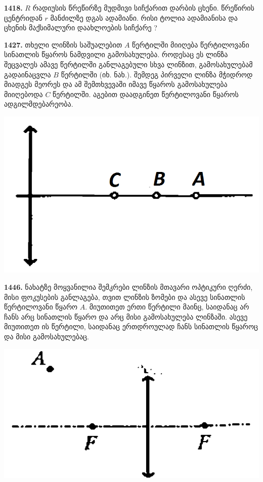 \documentclass[12pt,a4paper,]{report}
\begin{document}
\textbf{1418.} $R$ რადიუსის წრეწირზე მუდმივი სიჩქარით დარბის ცხენი. წრეწირის ცენტრიდან $r$ მანძილზე დგას ადამიანი. რისი ტოლია ადამიანისა და ცხენის მაქსიმალური დაახლოების სიჩქარე ? 

\textbf{1427.} თხელი ლინზის საშუალებით $A$ წერტილში მიიღება წერტილოვანი სინათლის წყაროს ნამდვილი გამოსახულება. როდესაც ეს ლინზა შეცვალეს ამავე წერტილში განლაგებული სხვა ლინზით, გამოსახულებამ გადაინაცვლა $B$ წერტილში (იხ. ნახ.). შემდეგ პირველი ლინზა მჭიდროდ მიადგეს მეორეს და ამ შემთხვევაში იმავე წყაროს გამოსახულება მიიღებოდა $C$ წერტილში. აგებით დაადგინეთ წერტილოვანი წყაროს ადგილმდებარეობა.
	\begin{center}
		\includegraphics[scale=0.4]{images/1427}
	\end{center}

\textbf{1446.} ნახატზე მოყვანილია შემკრები ლინზის მთავარი ოპტიკური ღერძი, მისი ფოკუსების განლაგება, თვით ლინზის ზომები და ასევე სინათლის წერტილოვანი წყარო $A$. მიუთითეთ ერთი წერტილი მაინც, საიდანაც არ ჩანს არც სინათლის წყარო და არც მისი გამოსახულება ლინზაში. ასევე მიუთითეთ ის წერტილი, საიდანაც ერთდროულად ჩანს სინათლის წყაროც და მისი გამოსახულებაც.
	\begin{center}
		\includegraphics[scale=0.4]{images/1446}
	\end{center}
\end{document}
